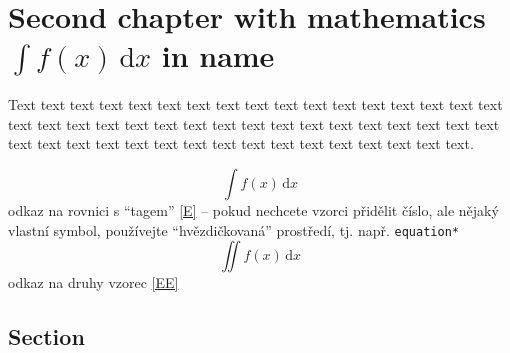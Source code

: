 \chapter{Second chapter with mathematics \texorpdfstring{$\int\! f(x)\,\mathrm{d}x$}{int f(x) dx} in name}

% 
% 
% 
% 
% 

Text text  text  text  text  text  text  text  text  text  text  text  text  text  text  text  text  text  text  text 
text  text  text  text  text  text  text  text  text  text  text  text  text  text  text  text  text  text  text  text 
text  text  text  text  text  text  text  text  text  text.

\begin{equation*}\label{E}\tag{rovnice}
 \int\! f(x)\,\mathrm{d}x
\end{equation*}
odkaz na rovnici s ``tagem'' \eqref{E} -- pokud nechcete vzorci přidělit číslo, ale nějaký vlastní symbol, používejte
``hvězdičkovaná'' prostředí, tj. např. \verb+equation*+
\begin{equation}\label{EE}
 \iint\! f(x)\,\mathrm{d}x
\end{equation}
odkaz na druhy vzorec \eqref{EE}

\lipsum[1]

\lipsum[9-14]
\lipsum[35-41]

\section{Section}

\lipsum[50-53]

